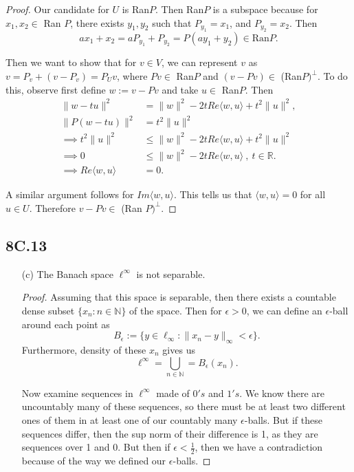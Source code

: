 \documentclass[12pt]{amsart}
\newcommand{\R}{\mathbb{R}}
\newcommand{\N}{\mathbb{N}}
\newcommand{\eq}[1]{\begin{equation*}#1\end{equation*}}
\newcommand{\al}[1]{\begin{align*}#1\end{align*}}
\begin{document}
\begin{proof}
    Our candidate for $U$ is Ran$P$. Then Ran$P$ is a subspace because for $x_1, x_2 \in$ Ran $P$, there exists $y_1, y_2$ such that $P_{y_1} = x_1$, and $P_{y_2} = x_2$. Then
    \eq{ax_1 + x_2 = aP_{y_1} + P_{y_2} = P(ay_1 + y_2) \in \text{Ran}P.}

    Then we want to show that for $v \in V$, we can represent $v$ as $v = P_v + (v-P_v) = P_Uv$, where $Pv \in$ Ran$P$ and $(v-Pv) \in$ (Ran$P)^\bot$. To do this, observe
    first define $w := v - Pv$ and take $u \in$ Ran$P$. Then 
    \al{\|w - tu\|^2 &= \|w\|^2 -2tRe\langle w, u\rangle + t^2 \|u\|^2, \\
        \|P(w-tu) \|^2 &= t^2 \|u\|^2 \\
        \implies t^2 \|u\|^2 &\leq \|w\|^2 - 2tRe \langle w, u \rangle + t^2 \|u\|^2 \\
        \implies 0 &\leq \|w\|^2 - 2t Re \langle w, u \rangle ~,~ t \in \R. \\
        \implies Re \langle w, u \rangle &= 0.}

    A similar argument follows for $Im\langle w, u \rangle$. This tells us that $\langle w, u \rangle = 0$ for all $u \in U$. Therefore $v - Pv \in$ (Ran $P)^\bot$.
\end{proof}

\subsection*{8C.13}

\begin{itemize}
    \item [(c)] The Banach space $\ell^\infty$ is not separable.
    
    \begin{proof}
        Assuming that this space is separable, then there exists a countable dense subset $\{x_n : n \in \N\}$ of the space. Then for $\epsilon > 0$, we can define an $\epsilon$-ball around each point as
        \eq{B_\epsilon := \{y \in \ell_\infty : \|x_n - y \|_\infty < \epsilon\}.}
        Furthermore, density of these $x_n$ gives us
        \eq{\ell^\infty = \bigcup_{n \in \N} = B_\epsilon(x_n).}

        Now examine sequences in $\ell^\infty$ made of $0's$ and $1's$. We know there are uncountably many of these sequences, so there must be at least two different ones of them in at least one of our countably many $\epsilon$-balls. But if these sequences differ, then the sup norm of their difference is 1, as they are sequences over 1 and 0. But then if $\epsilon < \frac{1}{2}$, then we have a contradiction because of the way we defined our $\epsilon$-balls.
    \end{proof}
\end{itemize}
\end{document}
